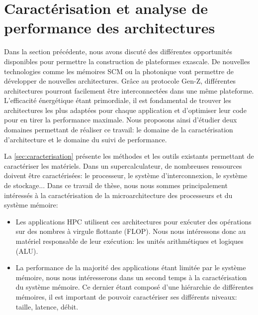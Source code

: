 \section{Caractérisation et analyse de performance des architectures}
\label{chap:performance} \label{sec:edl_perf_intro}

    Dans la section précédente, nous avons discuté des différentes opportunités disponibles pour permettre la construction de plateformes \gls{exascale}. De nouvelles technologies comme les mémoires SCM ou la photonique vont permettre de développer de nouvelles architectures. Grâce au protocole Gen-Z, différentes architectures pourront facilement être interconnectées dans une même plateforme. L'efficacité énergétique étant primordiale, il est fondamental de trouver les architectures les plus adaptées pour chaque application et d'optimiser leur code pour en tirer la performance maximale. Nous proposons ainsi d'étudier deux domaines permettant de réaliser ce travail: le domaine de la caractérisation d'architecture et le domaine du suivi de performance. 
    
    La \autoref{sec:caracterisation} présente les méthodes et les outils existants permettant de caractériser les matériels. Dans un supercalculateur, de nombreuses ressources doivent être caractérisées: le processeur, le système d'interconnexion, le système de stockage... 
    Dans ce travail de thèse, nous nous sommes principalement intéressés à la caractérisation de la microarchitecture des processeurs et du système mémoire:
    \begin{itemize}
        \item Les applications \gls{HPC} utilisent ces architectures pour exécuter des opérations sur des nombres à virgule flottante (\gls{FLOP}). Nous nous intéressons donc au matériel responsable de leur exécution: les unités arithmétiques et logiques (ALU).
        
        \item La performance de la majorité des applications étant limitée par le système mémoire, nous nous intéresserons dans un second temps à la caractérisation du système mémoire. Ce dernier étant composé d'une hiérarchie de différentes mémoires, il est important de pouvoir caractériser ses différents niveaux: taille, latence, débit.
    \end{itemize}
    
